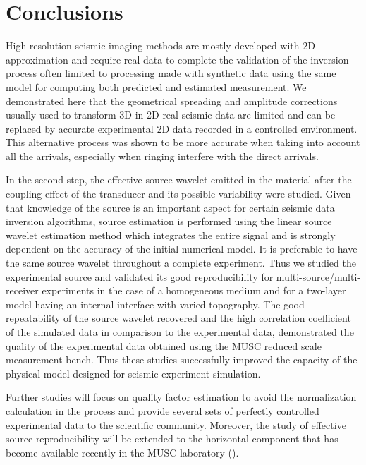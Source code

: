 \documentclass[extra,mreferee]{gji}
\begin{document}

\section{Conclusions}
 
High-resolution seismic imaging methods are mostly developed with 2D approximation and require real data to complete the validation of the inversion process often limited to processing made with synthetic data using the same model for computing both predicted and estimated measurement. We demonstrated here that the geometrical spreading and amplitude corrections usually used to transform 3D in 2D real seismic data are limited and can be replaced by accurate experimental 2D data recorded in a controlled environment. This alternative process was shown to be more accurate when taking into account all the arrivals, especially when ringing interfere with the direct arrivals.

In the second step, the effective source wavelet emitted in the material after the coupling effect of the transducer and its possible variability were studied. Given that knowledge of the source is an important aspect for certain seismic data inversion algorithms, source estimation is performed using the linear source wavelet estimation method which integrates the entire signal and is strongly dependent on the accuracy of the initial numerical model. It is preferable to have the same source wavelet throughout a complete experiment. Thus we studied the experimental source and validated its good reproducibility for multi-source/multi-receiver experiments in the case of a homogeneous medium and for a two-layer model having an internal interface with varied topography. The good repeatability of the source wavelet recovered and the high correlation coefficient of the simulated data in comparison to the experimental data, demonstrated the quality of the experimental data obtained using the MUSC reduced scale measurement bench. 
Thus these studies successfully improved the capacity of the physical model designed for seismic experiment simulation. 

Further studies will focus on quality factor estimation to avoid the normalization calculation in the process and provide several sets of perfectly controlled experimental data to the scientific community. Moreover, the study of effective source reproducibility will be extended to the horizontal component that has become available recently in the MUSC laboratory (\cite{valensi2015multicomponent}).
\end{document}
